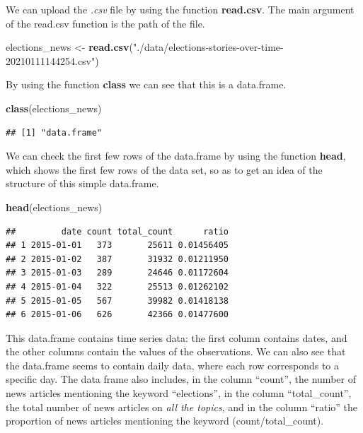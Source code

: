 \documentclass[
]{article}
\newenvironment{Shaded}{\begin{snugshade}}{\end{snugshade}}
\newcommand{\KeywordTok}[1]{\textcolor[rgb]{0.13,0.29,0.53}{\textbf{#1}}}
\newcommand{\NormalTok}[1]{#1}
\newcommand{\StringTok}[1]{\textcolor[rgb]{0.31,0.60,0.02}{#1}}
\begin{document}
We can upload the \emph{.csv} file by using the function \textbf{read.csv}. The main argument of the read.csv function is the path of the file.

\begin{Shaded}
\begin{Highlighting}[]
\NormalTok{elections_news <-}\StringTok{ }\KeywordTok{read.csv}\NormalTok{(}\StringTok{"./data/elections-stories-over-time-20210111144254.csv"}\NormalTok{)}
\end{Highlighting}
\end{Shaded}

By using the function \textbf{class} we can see that this is a data.frame.

\begin{Shaded}
\begin{Highlighting}[]
\KeywordTok{class}\NormalTok{(elections_news)}
\end{Highlighting}
\end{Shaded}

\begin{verbatim}
## [1] "data.frame"
\end{verbatim}

We can check the first few rows of the data.frame by using the function \textbf{head}, which shows the first few rows of the data set, so as to get an idea of the structure of this simple data.frame.

\begin{Shaded}
\begin{Highlighting}[]
\KeywordTok{head}\NormalTok{(elections_news)}
\end{Highlighting}
\end{Shaded}

\begin{verbatim}
##         date count total_count      ratio
## 1 2015-01-01   373       25611 0.01456405
## 2 2015-01-02   387       31932 0.01211950
## 3 2015-01-03   289       24646 0.01172604
## 4 2015-01-04   322       25513 0.01262102
## 5 2015-01-05   567       39982 0.01418138
## 6 2015-01-06   626       42366 0.01477600
\end{verbatim}

This data.frame contains time series data: the first column contains dates, and the other columns contain the values of the observations. We can also see that the data.frame seems to contain daily data, where each row corresponds to a specific day. The data frame also includes, in the column ``count'', the number of news articles mentioning the keyword ``elections'', in the column ``total\_count'', the total number of news articles on \emph{all the topics}, and in the column ``ratio'' the proportion of news articles mentioning the keyword (count/total\_count).
\end{document}

